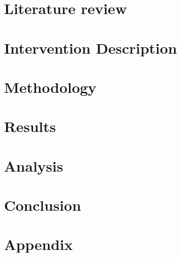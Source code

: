 \documentclass[11pt,usenames,dvipsnames]{article} %
\begin{document}
\section{Literature review}  \label{sec:lit_review}


\section{Intervention Description} \label{sec:proj_desc}


\section{Methodology} \label{sec:methodology}


\section{Results}
\section{Analysis}

\section{Conclusion}




\newpage
{\footnotesize
	
	 \label{sec:bibliography}
}

\newpage
\section*{Appendix}  \label{sec:appendices}
\begin{appendices}
	
\end{appendices}
\end{document}
